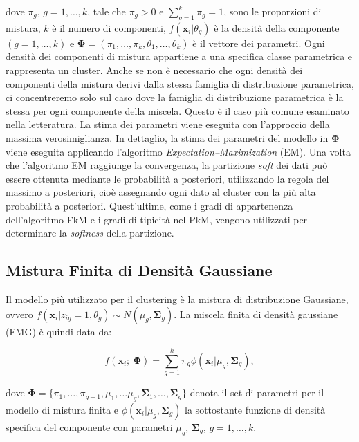 \documentclass[12pt]{article}
\begin{document}
dove $\pi_g$, $g = 1, \dots, k$, tale che $\pi_g > 0$ e $\sum_{g=1}^{k} \pi_g = 1$, sono le proporzioni di mistura, $k$ è il numero di componenti, $f(\mathbf{x}_i|\theta_g)$ è la densità della componente $(g = 1, \dots, k)$ e $\boldsymbol{\Phi} = (\pi_1, \dots, \pi_k, \theta_1, \dots, \theta_k)$ è il vettore dei parametri. Ogni densità dei componenti di mistura appartiene a una specifica classe parametrica e rappresenta un cluster. Anche se non è necessario che ogni densità dei componenti della mistura derivi dalla stessa famiglia di distribuzione parametrica, ci concentreremo solo sul caso dove la famiglia di distribuzione parametrica è la stessa per ogni componente della miscela. Questo è il caso più comune esaminato nella letteratura.
La stima dei parametri viene eseguita con l'approccio della massima verosimiglianza. In dettaglio, la stima dei parametri del modello in $\boldsymbol{\Phi}$ viene eseguita applicando l'algoritmo \textit{Expectation–Maximization} (EM). Una volta che l'algoritmo EM raggiunge la convergenza, la partizione \textit{soft} dei dati può essere ottenuta mediante le probabilità a posteriori, utilizzando la regola del massimo a posteriori, cioè assegnando ogni dato al cluster con la più alta probabilità a posteriori. Quest'ultime, come i gradi di appartenenza dell'algoritmo FkM e i gradi di tipicità nel PkM, vengono utilizzati per determinare la \textit{softness} della partizione.

\subsection{Mistura Finita di Densità Gaussiane}

Il modello più utilizzato per il clustering è la mistura di distribuzione Gaussiane, ovvero $f(\mathbf{x}_i|z_{ig}=1,\theta_g) \sim N(\mu_g, \mathbf{\Sigma}_g)$. La miscela finita di densità gaussiane (FMG) è quindi data da:

\begin{equation}
	f(\mathbf{x}_i;\ \boldsymbol{\Phi}) = \sum_{g=1}^{k} \pi_g \phi(\mathbf{x}_i|\mu_g, \boldsymbol{\Sigma}_g),
	\label{eq:9}
\end{equation}

dove $\boldsymbol{\Phi} = \{\pi_1, \dots, \pi_{g-1}, \mu_1, \dots \mu_g, \boldsymbol{\Sigma}_1, \dots, \boldsymbol{\Sigma}_g\}$ denota il set di parametri per il modello di mistura finita e $\phi(\mathbf{x}_i|\mu_g, \boldsymbol{\Sigma}_g)$ la sottostante funzione di densità specifica del componente con parametri $\mu_g$, $\boldsymbol{\Sigma}_g$, $g = 1, \dots, k$.
\end{document}
